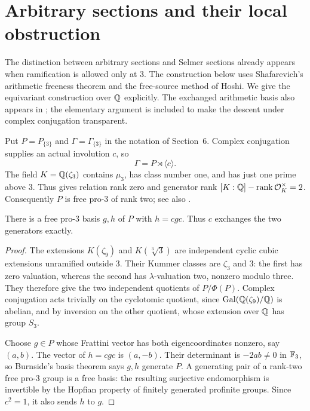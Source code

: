 \section{Arbitrary sections and their local obstruction}
\label{sec:arbitrary}

The distinction between arbitrary sections and Selmer sections already
appears when ramification is allowed only at $3$. The construction below
uses Shafarevich's arithmetic freeness theorem and the free-source method
of Hoshi. We give the equivariant construction over $\mathbb Q$ explicitly.
The exchanged arithmetic basis also appears in
\citet[Theorem 12, p.~12]{Medvedovsky2016}; the elementary argument is
included to make the descent under complex conjugation transparent.

Put $P=P_{\{3\}}$ and $\Gamma=\Gamma_{\{3\}}$ in the notation of
Section~6. Complex conjugation supplies an actual involution $c$, so
\[
\Gamma=P\rtimes\langle c\rangle.
\]
The field $K=\mathbb Q(\zeta_3)$ contains $\mu_3$, has class number one, and
has just one prime above $3$. Thus
\citet[\S4, example 1 after Theorem 5, p.~82]{Shafarevich1963}
gives relation rank zero and generator rank
$[K:\mathbb Q]-\operatorname{rank}\mathcal O_K^\times=2$.
Consequently $P$ is free pro-$3$ of rank two; see also
\citet[Lemma 3.2]{Hoshi2010}.

\begin{lemma}\label{lem:exchanged}
There is a free pro-$3$ basis $g,h$ of $P$ with $h=cgc$.
Thus $c$ exchanges the two generators exactly.
\end{lemma}
\begin{proof}
The extensions $K(\zeta_9)$ and $K(\sqrt[3]{3})$ are independent
cyclic cubic extensions unramified outside $3$. Their Kummer classes
are $\zeta_3$ and $3$: the first has zero valuation, whereas the
second has $\lambda$-valuation two, nonzero modulo three. They
therefore give the two independent quotients of $P/\Phi(P)$.
Complex conjugation acts trivially on the cyclotomic quotient,
since $\operatorname{Gal}(\mathbb Q(\zeta_9)/\mathbb Q)$ is abelian, and by inversion on the
other quotient, whose extension over $\mathbb Q$ has group $S_3$.

Choose $g\in P$ whose Frattini vector has both eigencoordinates
nonzero, say $(a,b)$. The vector of $h=cgc$ is $(a,-b)$.
Their determinant is $-2ab\ne0$ in $\mathbb F_3$, so Burnside's basis
theorem says $g,h$ generate $P$. A generating pair of a rank-two
free pro-$3$ group is a free basis: the resulting surjective
endomorphism is invertible by the Hopfian property of finitely
generated profinite groups. Since $c^2=1$, it also sends $h$ to $g$.
\end{proof}

